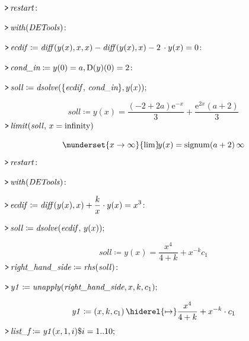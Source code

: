 \documentclass{article}
\begin{document}
{}
\mapleinput
{$ \displaystyle \texttt{>\,} \mathit{restart} \colon  $}

\mapleinput
{$ \displaystyle \texttt{>\,} \mathit{with} (\mathit{DETools})\colon  $}

\mapleinput
{$ \displaystyle \texttt{>\,} \mathit{ecdif} \coloneqq \mathit{diff} (y (x),x ,x)-\mathit{diff} (y (x),x)-2\,\cdot y (x)=0\colon  $}

\mapleinput
{$ \displaystyle \texttt{>\,} \textit{cond\_in} \coloneqq y (0)=a ,\mathrm{D}(y)(0)=2\colon  $}

\mapleinput
{$ \displaystyle \texttt{>\,} \mathit{soll} \coloneqq \mathit{dsolve} (\{\mathit{ecdif} ,\,\textit{cond\_in} \},y (x)); $}

\begin{dmath}\label{(27)}
\mathit{soll} \coloneqq y \! \left(x \right)=\frac{\left(-2+2 a \right) {\mathrm e}^{-x}}{3}+\frac{{\mathrm e}^{2 x} \left(a +2\right)}{3}
\end{dmath}
\mapleinput
{$ \displaystyle \texttt{>\,} \mathit{limit} (\mathit{soll} ,\,x =\mathrm{infinity}) $}

\begin{dmath}\label{(28)}
\munderset{x \rightarrow \infty}{\mathrm{lim}}\! y \! \left(x \right)=\mathrm{signum}\! \left(a +2\right) \infty 
\end{dmath}
\mapleinput
{$ \displaystyle \texttt{>\,} \mathit{restart} \colon  $}

\mapleinput
{$ \displaystyle \texttt{>\,} \mathit{with} (\mathit{DETools})\colon  $}

\mapleinput
{$ \displaystyle \texttt{>\,} \mathit{ecdif} \coloneqq \mathit{diff} (y (x),x)+\frac{k}{x}\cdot y (x)=x^{3}\colon  $}

\mapleinput
{$ \displaystyle \texttt{>\,} \mathit{soll} \coloneqq \mathit{dsolve} (\mathit{ecdif} ,\,y (x)); $}

\begin{dmath}\label{(29)}
\mathit{soll} \coloneqq y \! \left(x \right)=\frac{x^{4}}{4+k}+x^{-k} c_{1}
\end{dmath}
\mapleinput
{$ \displaystyle \texttt{>\,} \textit{right\_hand\_side} \coloneqq \mathit{rhs} (\mathit{soll})\colon  $}

\mapleinput
{$ \displaystyle \texttt{>\,} \mathit{y1} \coloneqq \mathit{unapply} (\textit{right\_hand\_side} ,x ,k ,c_{1}); $}

\begin{dmath}\label{(30)}
\mathit{y1} \coloneqq \left(x ,k ,c_{1}\right)\hiderel{\mapsto }\frac{x^{4}}{4+k}+x^{-k}\cdot c_{1}
\end{dmath}
\mapleinput
{$ \displaystyle \texttt{>\,} \textit{list\_f} \coloneqq \mathit{y1} (x ,1,i)\$ i =1..10; $}
\end{document}
